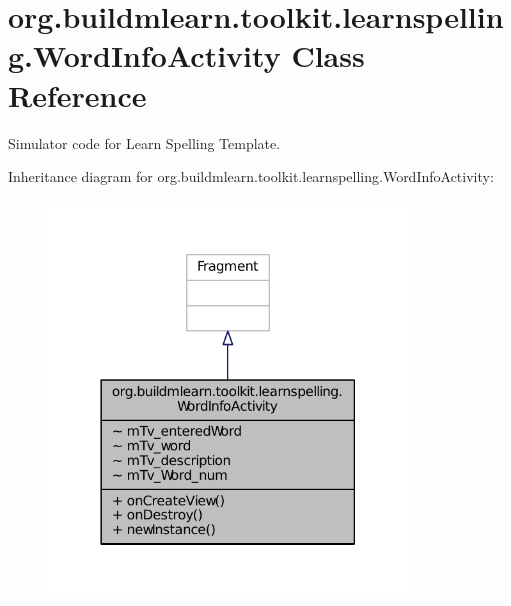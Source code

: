 \hypertarget{classorg_1_1buildmlearn_1_1toolkit_1_1learnspelling_1_1WordInfoActivity}{\section{org.\-buildmlearn.\-toolkit.\-learnspelling.\-Word\-Info\-Activity Class Reference}
\label{classorg_1_1buildmlearn_1_1toolkit_1_1learnspelling_1_1WordInfoActivity}
}


Simulator code for Learn Spelling Template.  




Inheritance diagram for org.\-buildmlearn.\-toolkit.\-learnspelling.\-Word\-Info\-Activity\-:
\nopagebreak
\begin{figure}[H]
\begin{center}
\leavevmode
\includegraphics[width=270pt]{db/d1a/classorg_1_1buildmlearn_1_1toolkit_1_1learnspelling_1_1WordInfoActivity__inherit__graph}
\end{center}
\end{figure}


